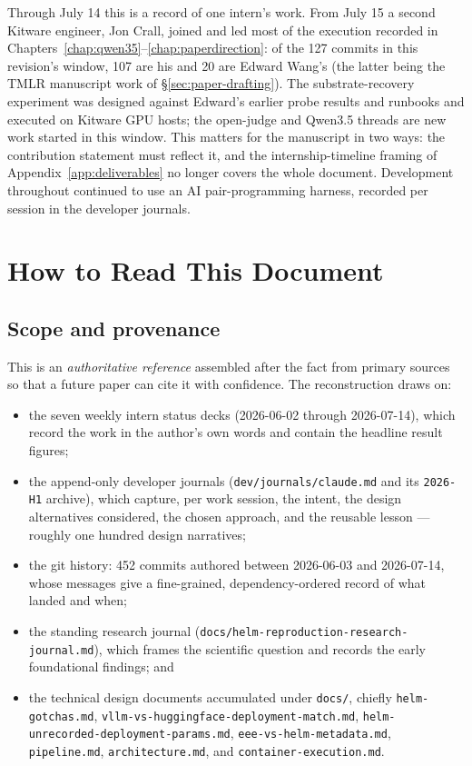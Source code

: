 \documentclass[11pt]{report}
\newcommand{\file}[1]{\texttt{#1}}
\begin{document}
Through July 14 this is a record of one intern's work. From July 15 a second
Kitware engineer, Jon Crall, joined and led most of the execution recorded in
Chapters~\ref{chap:qwen35}--\ref{chap:paperdirection}: of the 127 commits in this
revision's window, 107 are his and 20 are Edward Wang's (the latter being the TMLR
manuscript work of \S\ref{sec:paper-drafting}). The substrate-recovery experiment
was designed against Edward's earlier probe results and runbooks and executed on
Kitware GPU hosts; the open-judge and Qwen3.5 threads are new work started in this
window. This matters for the manuscript in two ways: the contribution statement must
reflect it, and the internship-timeline framing of Appendix~\ref{app:deliverables}
no longer covers the whole document. Development throughout continued to use an
AI pair-programming harness, recorded per session in the developer journals.


\chapter{How to Read This Document}

\section{Scope and provenance}

This is an \emph{authoritative reference} assembled after the fact from primary
sources so that a future paper can cite it with confidence. The reconstruction
draws on:

\begin{itemize}[nosep]
  \item the seven weekly intern status decks (2026-06-02 through 2026-07-14),
        which record the work in the author's own words and contain the headline
        result figures;
  \item the append-only developer journals (\file{dev/journals/claude.md} and its
        \file{2026-H1} archive), which capture, per work session, the intent, the
        design alternatives considered, the chosen approach, and the reusable
        lesson --- roughly one hundred design narratives;
  \item the git history: 452 commits authored between 2026-06-03 and 2026-07-14,
        whose messages give a fine-grained, dependency-ordered record of what
        landed and when;
  \item the standing research journal
        (\file{docs/helm-reproduction-research-journal.md}), which frames the
        scientific question and records the early foundational findings; and
  \item the technical design documents accumulated under \file{docs/}, chiefly
        \file{helm-gotchas.md}, \file{vllm-vs-huggingface-deployment-match.md},
        \file{helm-unrecorded-deployment-params.md}, \file{eee-vs-helm-metadata.md},
        \file{pipeline.md}, \file{architecture.md}, and
        \file{container-execution.md}.
\end{itemize}
\end{document}
